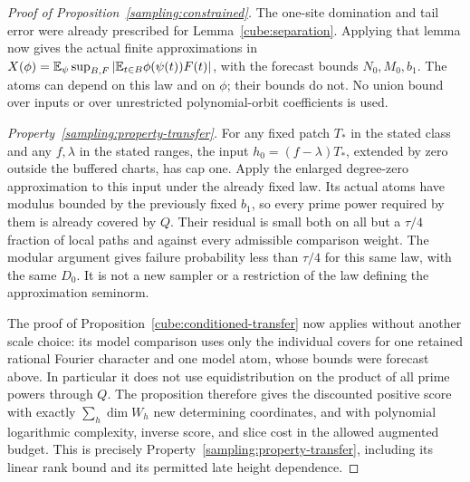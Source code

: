 \begin{proof}[Proof of Proposition~\ref{sampling:constrained}]
The one-site domination and tail error were already prescribed for
Lemma~\ref{cube:separation}.  Applying that lemma now gives the actual
finite approximations in
$X(\phi)=\mathbb E_\psi\sup_{B,F}|\mathbb E_{t\in B}\phi(\psi(t))F(t)|$,
with the forecast bounds $N_0,M_0,b_1$.  The atoms can depend on this
law and on $\phi$; their bounds do not.  No union bound over inputs or
over unrestricted polynomial-orbit coefficients is used.

\emph{Property~\ref{sampling:property-transfer}.}
For any fixed patch $T_*$ in the stated class and any $f,\lambda$ in
the stated ranges, the input $h_0=(f-\lambda)T_*$, extended by zero
outside the buffered charts, has cap one.  Apply the enlarged
degree-zero approximation to this input under the already fixed law.
Its actual atoms have modulus bounded by the previously fixed $b_1$,
so every prime power required by them is already covered by $Q$.
Their residual is small both on all but a $\tau/4$ fraction of local
paths and against every admissible comparison weight.  The modular
argument gives failure probability less than $\tau/4$ for this same
law, with the same $D_0$.  It is not a new sampler or a restriction
of the law defining the approximation seminorm.

The proof of Proposition~\ref{cube:conditioned-transfer} now applies
without another scale choice: its model comparison uses only the
individual covers for one retained rational Fourier character and
one model atom, whose bounds were forecast above.  In particular it
does not use equidistribution on the product of all prime powers
through $Q$. The proposition therefore gives the discounted positive
score with exactly $\sum_h\dim W_h$ new determining coordinates,
and with polynomial logarithmic complexity, inverse score, and
slice cost in the allowed augmented budget. This is precisely
Property~\ref{sampling:property-transfer}, including its
linear rank bound and its permitted late height dependence.


\end{proof}
